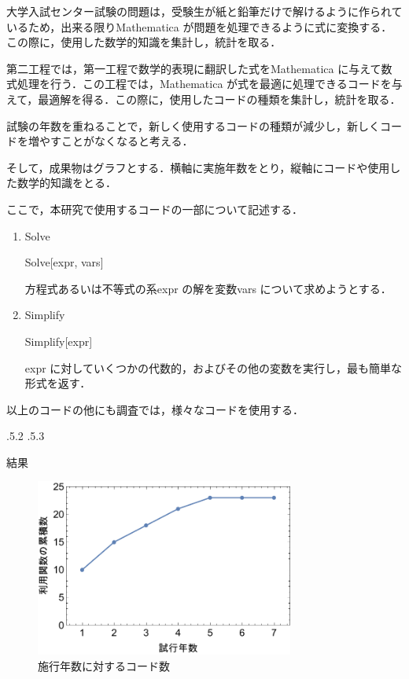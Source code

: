 \documentclass[uplatex,twocolumn]{jsarticle}
\makeatletter
\renewcommand{\section}{%
    \if@slide\clearpage\fi
    \@startsection{section}{1}{\z@}%
    {\Cvs \@plus.5\Cdp \@minus.2\Cdp}%
    {.5\Cvs \@plus.3\Cdp}%
    {\normalfont\raggedright}}
\makeatother
\begin{document}
大学入試センター試験の問題は，受験生が紙と鉛筆だけで解けるように作られているため，出来る限りMathematica が問題を処理できるように式に変換する．この際に，使用した数学的知識を集計し，統計を取る．

第二工程では，第一工程で数学的表現に翻訳した式をMathematica に与えて数式処理を行う．この工程では，Mathematica が式を最適に処理できるコードを与えて，最適解を得る．この際に，使用したコードの種類を集計し，統計を取る．

試験の年数を重ねることで，新しく使用するコードの種類が減少し，新しくコードを増やすことがなくなると考える．

そして，成果物はグラフとする．横軸に実施年数をとり，縦軸にコードや使用した数学的知識をとる．


ここで，本研究で使用するコードの一部について記述する\cite{wolfram2014}．

\begin{enumerate}
\item Solve

Solve[expr, vars]

方程式あるいは不等式の系expr の解を変数vars について求めようとする．

\item Simplify

Simplify[expr]

expr に対していくつかの代数的，およびその他の変数を実行し，最も簡単な形式を返す．

\end{enumerate}

以上のコードの他にも調査では，様々なコードを使用する．

\section{結果}

\begin{figure}[!htb]
\centering
\includegraphics[width=8.5cm]{code.pdf}
\caption{施行年数に対するコード数}\label{サンプル図}
\end{figure}
\end{document}
